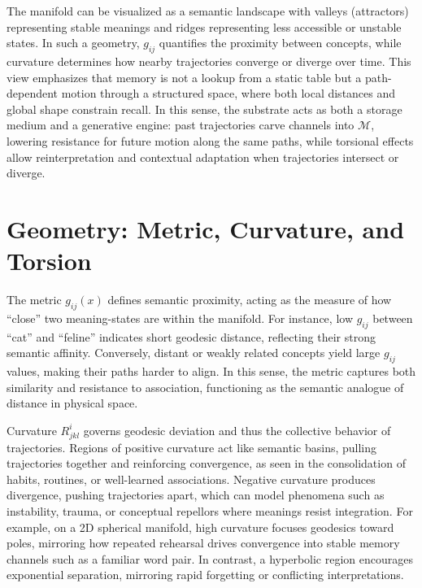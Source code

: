 \documentclass[a4paper,12pt]{article}
\newcommand{\M}{\mathcal{M}}
\begin{document}
The manifold can be visualized as a semantic landscape with valleys (attractors) 
representing stable meanings and ridges representing less accessible or unstable states. 
In such a geometry, $g_{ij}$ quantifies the proximity between concepts, while curvature 
determines how nearby trajectories converge or diverge over time. This view emphasizes 
that memory is not a lookup from a static table but a path-dependent motion through a 
structured space, where both local distances and global shape constrain recall. In this 
sense, the substrate acts as both a storage medium and a generative engine: past 
trajectories carve channels into $\M$, lowering resistance for future motion along the 
same paths, while torsional effects allow reinterpretation and contextual adaptation 
when trajectories intersect or diverge.

\section{Geometry: Metric, Curvature, and Torsion}
The metric $g_{ij}(x)$ defines semantic proximity, acting as the measure of how 
``close'' two meaning-states are within the manifold. For instance, low $g_{ij}$ between 
``cat'' and ``feline'' indicates short geodesic distance, reflecting their strong semantic 
affinity. Conversely, distant or weakly related concepts yield large $g_{ij}$ values, 
making their paths harder to align. In this sense, the metric captures both similarity 
and resistance to association, functioning as the semantic analogue of distance in 
physical space.

Curvature $R^i_{jkl}$ governs geodesic deviation and thus the collective behavior of 
trajectories. Regions of positive curvature act like semantic basins, pulling trajectories 
together and reinforcing convergence, as seen in the consolidation of habits, routines, 
or well-learned associations. Negative curvature produces divergence, pushing trajectories 
apart, which can model phenomena such as instability, trauma, or conceptual repellors 
where meanings resist integration. For example, on a 2D spherical manifold, high curvature 
focuses geodesics toward poles, mirroring how repeated rehearsal drives convergence into 
stable memory channels such as a familiar word pair. In contrast, a hyperbolic region 
encourages exponential separation, mirroring rapid forgetting or conflicting interpretations.
\end{document}
